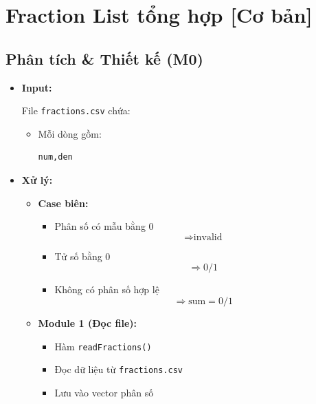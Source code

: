 \section{Fraction List tổng hợp [Cơ bản]}
\subsection{Phân tích \& Thiết kế (M0)}

\begin{itemize}

    \item \textbf{Input:}

    File \texttt{fractions.csv} chứa:

    \begin{itemize}
        \item Mỗi dòng gồm:
        \begin{lstlisting}
num,den
\end{lstlisting}
    \end{itemize}

    \item \textbf{Xử lý:}

    \begin{itemize}

        \item \textbf{Case biên:}

        \begin{itemize}
            \item Phân số có mẫu bằng 0
            \[
                \Rightarrow \text{invalid}
            \]

            \item Tử số bằng 0
            \[
                \Rightarrow 0/1
            \]

            \item Không có phân số hợp lệ
            \[
                \Rightarrow \text{sum} = 0/1
            \]
        \end{itemize}

        \item \textbf{Module 1 (Đọc file):}

        \begin{itemize}
            \item Hàm \texttt{readFractions()}
            \item Đọc dữ liệu từ \texttt{fractions.csv}
            \item Lưu vào vector phân số
        \end{itemize}


\end{itemize}
\end{itemize}
